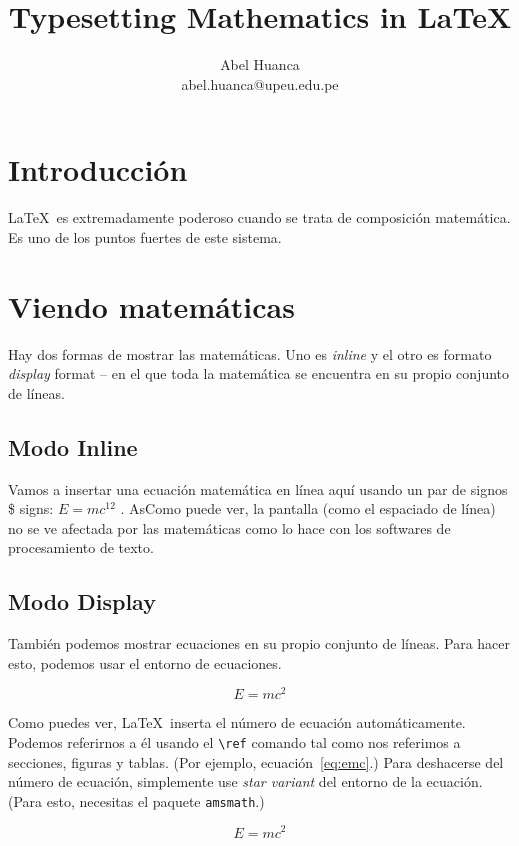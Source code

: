 \documentclass{article}
\begin{document}
	\title{Typesetting Mathematics in \LaTeX}
	\author{Abel Huanca \\ abel.huanca@upeu.edu.pe}
	\maketitle
	
	
	\section{Introducción} 
	\LaTeX\ es extremadamente poderoso cuando se trata de composición matemática. Es uno de los puntos fuertes de este sistema. 
	
	\section{Viendo matemáticas}
	Hay dos formas de mostrar las matemáticas. Uno es  \emph{inline} y el otro es formato \emph{display} format -- en el que toda la matemática se encuentra en su propio conjunto de líneas.
	
	
	\subsection{Modo Inline}
	Vamos a insertar una ecuación matemática en línea aquí usando un par de signos \$ signs: $ E = mc^{12}$    . AsComo puede ver, la pantalla (como el espaciado de línea) no se ve afectada por las matemáticas como lo hace con los softwares de procesamiento de texto.
	
	\subsection{Modo Display}
	También podemos mostrar ecuaciones en su propio conjunto de líneas. Para hacer esto, podemos usar el entorno de ecuaciones.
	
	\begin{equation}\label{eq:emc}
	E = mc^2
	\end{equation}
	
	Como puedes ver, \LaTeX\ inserta el número de ecuación automáticamente. Podemos referirnos a él usando el \verb|\ref| comando tal como nos referimos a secciones, figuras y tablas. (Por ejemplo, ecuación~\ref{eq:emc}.) Para deshacerse del número de ecuación, simplemente use  \emph{star variant} del entorno de la ecuación. (Para esto, necesitas el paquete \texttt{amsmath}.)
	
	\begin{equation*}
	E = mc^2
	\end{equation*}
	
\end{document}
